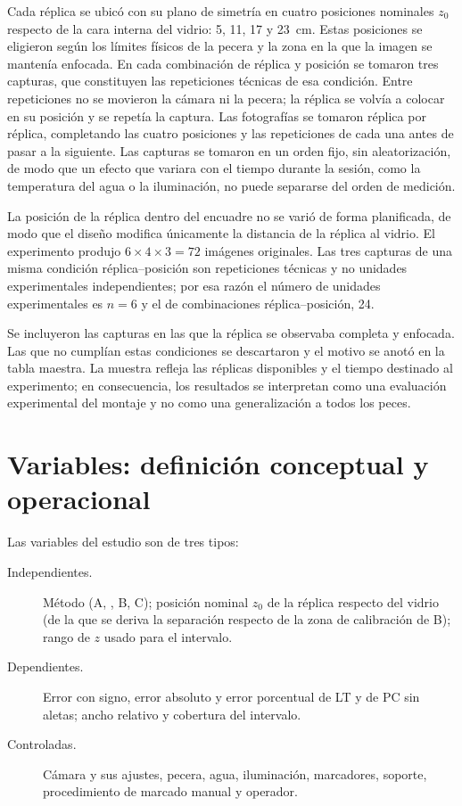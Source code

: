 Cada réplica se ubicó con su plano de simetría en cuatro posiciones nominales $z_0$ respecto de la cara interna del vidrio: 5, 11, 17 y 23~cm. Estas posiciones se eligieron según los límites físicos de la pecera y la zona en la que la imagen se mantenía enfocada. En cada combinación de réplica y posición se tomaron tres capturas, que constituyen las repeticiones técnicas de esa condición. Entre repeticiones no se movieron la cámara ni la pecera; la réplica se volvía a colocar en su posición y se repetía la captura. Las fotografías se tomaron réplica por réplica, completando las cuatro posiciones y las repeticiones de cada una antes de pasar a la siguiente. Las capturas se tomaron en un orden fijo, sin aleatorización, de modo que un efecto que variara con el tiempo durante la sesión, como la temperatura del agua o la iluminación, no puede separarse del orden de medición.

La posición de la réplica dentro del encuadre no se varió de forma planificada, de modo que el diseño modifica únicamente la distancia de la réplica al vidrio. El experimento produjo $6 \times 4 \times 3 = 72$ imágenes originales. Las tres capturas de una misma condición réplica--posición son repeticiones técnicas y no unidades experimentales independientes; por esa razón el número de unidades experimentales es $n = 6$ y el de combinaciones réplica--posición, 24.

Se incluyeron las capturas en las que la réplica se observaba completa y enfocada. Las que no cumplían estas condiciones se descartaron y el motivo se anotó en la tabla maestra. La muestra refleja las réplicas disponibles y el tiempo destinado al experimento; en consecuencia, los resultados se interpretan como una evaluación experimental del montaje y no como una generalización a todos los peces.

\section{Variables: definición conceptual y operacional}
\label{sec:variables}

Las variables del estudio son de tres tipos:

\begin{description}
  \item[Independientes.] Método (A, \Aprime, B, C); posición nominal $z_0$ de la réplica respecto del vidrio (de la que se deriva la separación respecto de la zona de calibración de B); rango de $z$ usado para el intervalo.
  \item[Dependientes.] Error con signo, error absoluto y error porcentual de LT y de PC sin aletas; ancho relativo y cobertura del intervalo.
  \item[Controladas.] Cámara y sus ajustes, pecera, agua, iluminación, marcadores, soporte, procedimiento de marcado manual y operador.
\end{description}

